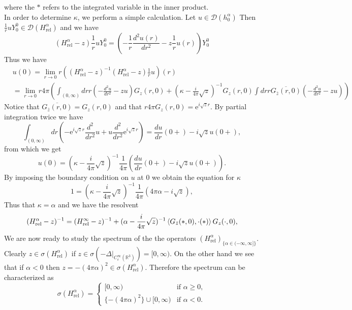 \documentclass[a4paper,11pt]{article}
\newcommand{\euler}[1]{\text{e}^{#1}}
\newcommand{\dom}[1]{\mathscr D\left(#1\right)}
\newcommand{\R}{\mathbb{R}}
\begin{document}
where the $ \ast $ refers to the integrated variable in the inner product.\\
In order to determine $ \kappa $, we perform a simple calculation. Let $ u\in\dom{h^\alpha_0} $ Then $ \frac{1}{r}uY_0^0\in\dom{H_\text{rel}^\alpha} $ and we have \begin{equation}
(H_\text{rel}^\alpha-z)\frac{1}{r}uY_0^0=\left(-\frac{1}{r}\frac{d^2u(r)}{dr^2}-z\frac{1}{r}u(r)\right)Y^0_0
\end{equation}
Thus we have \begin{equation}
\begin{aligned}
&u(0)=\lim\limits_{r\to0}r\left((H_\text{rel}^\alpha-z)^{-1}(H_\text{rel}^\alpha-z)\frac{1}{r}u\right)(r)\\&=\lim\limits_{r\to0}r4\pi\left(\int_{(0,\infty)}drr \left(-\frac{d^2u}{dr^2}-zu\right)G_z(r,0)+(\kappa-\frac{i}{4\pi}\sqrt{z})^{-1}G_z(r,0)\int dr r\overline{G_{\bar{z}}(r,0)}\left(-\frac{d^2u}{dr^2}-zu\right)\right)
\end{aligned}
\end{equation}
Notice that $ \overline{G_{\bar{z}}(r,0)}=G_z(r,0) $ and that $ r4\pi G_z(r,0)=\euler{i\sqrt{z}r} $. By partial integration twice we have
\begin{equation}
\int_{(0,\infty)}dr \left(-\euler{i\sqrt{z}r}\frac{d^2}{dr^2}u+u\frac{d^2}{dr^2}\euler{i\sqrt{z}r}\right)=\frac{du}{dr}(0+)-i\sqrt{z}u(0+),
\end{equation}
from which we get
\begin{equation}
u(0)=(\kappa-\frac{i}{4\pi}\sqrt{z})^{-1}\frac{1}{4\pi}\left(\frac{du}{dr}(0+)-i\sqrt{z}u(0+)\right).
\end{equation}
By imposing the boundary condition on $ u $ at $ 0 $ we obtain the equation for $ \kappa $\begin{equation}
1=(\kappa-\frac{i}{4\pi}\sqrt{z})^{-1}\frac{1}{4\pi}\left(4\pi\alpha-i\sqrt{z}\right),
\end{equation}
Thus that $ \kappa=\alpha $ and we have the resolvent \begin{equation}
(H_{\text{rel}}^\alpha-z)^{-1}=(H_{\text{rel}}^\infty-z)^{-1}+(\alpha-\frac{i}{4\pi}\sqrt{z})^{-1}\braket{G_{\bar{z}}(\ast,0),\cdot(\ast)}G_z(\cdot,0),
\end{equation}
We are now ready to study the spectrum of the the operators $ (H_{\text{rel}}^\alpha)_{\{\alpha\in(-\infty,\infty]\}} $. Clearly $ z\in\sigma(H_{\text{rel}}^\alpha) $ if $ z\in\sigma(-\Delta|_{C_c^\infty(\R^3)})=[0,\infty) $. On the other hand we see that if $ \alpha<0 $ then $ z=-(4\pi\alpha)^2\in\sigma(H_{\text{rel}}^\alpha) $. Therefore the spectrum can be characterized as\begin{equation}
\sigma(H_{\text{rel}}^\alpha)=\begin{cases}
[0,\infty)&\text{if }\alpha\geq0,\\
\{-(4\pi\alpha)^2\}\cup[0,\infty)&\text{if }\alpha<0.
\end{cases}
\end{equation}
\end{document}
